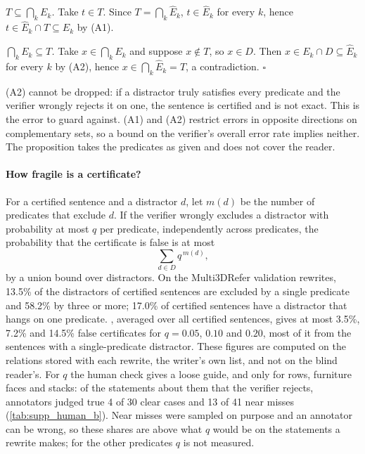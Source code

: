 \emph{$T \subseteq \bigcap_k E_k$.}
Take $t \in T$.
Since $T = \bigcap_k \hat{E}_k$, $t \in \hat{E}_k$ for every $k$, hence $t \in \hat{E}_k \cap T \subseteq E_k$ by (A1).

\emph{$\bigcap_k E_k \subseteq T$.}
Take $x \in \bigcap_k E_k$ and suppose $x \notin T$, so $x \in D$.
Then $x \in E_k \cap D \subseteq \hat{E}_k$ for every $k$ by (A2), hence $x \in \bigcap_k \hat{E}_k = T$, a contradiction. \hfill$\square$

(A2) cannot be dropped: if a distractor truly satisfies every predicate and the verifier wrongly rejects it on one, the sentence is certified and is not exact.
This is the error to guard against.
(A1) and (A2) restrict errors in opposite directions on complementary sets, so a bound on the verifier's overall error rate implies neither.
The proposition takes the predicates as given and does not cover the reader.

\paragraph{How fragile is a certificate?}
For a certified sentence and a distractor $d$, let $m(d)$ be the number of predicates that exclude $d$.
If the verifier wrongly excludes a distractor with probability at most $q$ per predicate, independently across predicates, the probability that the certificate is false is at most
\begin{equation}
  \sum_{d \in D} q^{\,m(d)} ,
  \label{eq:margin}
\end{equation}
by a union bound over distractors.
On the Multi3DRefer validation rewrites, 13.5\% of the distractors of certified sentences are excluded by a single predicate and 58.2\% by three or more; 17.0\% of certified sentences have a distractor that hangs on one predicate.
, averaged over all certified sentences, gives at most 3.5\%, 7.2\% and 14.5\% false certificates for $q = 0.05$, $0.10$ and $0.20$, most of it from the sentences with a single-predicate distractor.
These figures are computed on the relations stored with each rewrite, the writer's own list, and not on the blind reader's.
For $q$ the human check gives a loose guide, and only for rows, furniture faces and stacks: of the statements about them that the verifier rejects, annotators judged true 4 of 30 clear cases and 13 of 41 near misses (\cref{tab:supp_human_b}).
Near misses were sampled on purpose and an annotator can be wrong, so these shares are above what $q$ would be on the statements a rewrite makes; for the other predicates $q$ is not measured.

